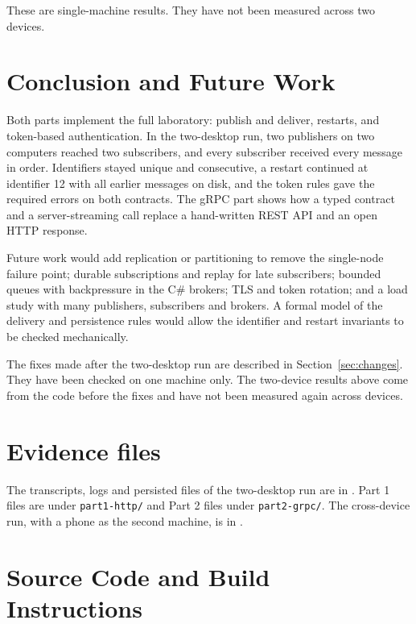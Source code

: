 \documentclass[12pt,a4paper]{article}
\begin{document}
These are single-machine results. They have not been measured across two devices.

\section{Conclusion and Future Work}
Both parts implement the full laboratory: publish and deliver, restarts, and
token-based authentication. In the two-desktop run, two publishers on two
computers reached two subscribers, and every subscriber received every message in
order. Identifiers stayed unique and consecutive, a restart continued at
identifier 12 with all earlier messages on disk, and the token rules gave the
required errors on both contracts. The gRPC part shows how a typed contract and a
server-streaming call replace a hand-written REST API and an open HTTP response.

Future work would add replication or partitioning to remove the single-node
failure point; durable subscriptions and replay for late subscribers; bounded
queues with backpressure in the C\# brokers; TLS and token rotation; and a load study with many
publishers, subscribers and brokers. A formal model of the delivery and
persistence rules would allow the identifier and restart invariants to be checked
mechanically.

The fixes made after the two-desktop run are described in Section~\ref{sec:changes}.
They have been checked on one machine only. The two-device results above come from
the code before the fixes and have not been measured again across devices.

\section{Evidence files}
\label{app:evidence}
The transcripts, logs and persisted files of the two-desktop run are in
. Part 1 files are under
\texttt{part1-http/} and Part 2 files under \texttt{part2-grpc/}. The cross-device
run, with a phone as the second machine, is in .

\section{Source Code and Build Instructions}\label{sec:source}
\end{document}
